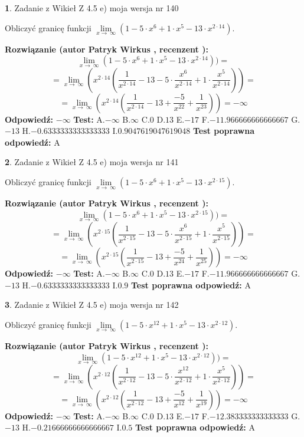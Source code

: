 \documentclass[12pt, a4paper]{article}
\theoremstyle{definition} %
\newtheorem{zad}{}
\newcommand{\zadStart}[1]{\begin{zad}#1\newline}
\newcommand{\zadStop}{\end{zad}}
\newcommand{\rozwStart}[2]{\noindent \textbf{Rozwiązanie (autor #1 , recenzent #2): }\newline}
\newcommand{\rozwStop}{\newline}
\newcommand{\odpStart}{\noindent \textbf{Odpowiedź:}\newline}
\newcommand{\odpStop}{\newline}
\newcommand{\testStart}{\noindent \textbf{Test:}\newline}
\newcommand{\testStop}{\newline}
\newcommand{\kluczStart}{\noindent \textbf{Test poprawna odpowiedź:}\newline}
\newcommand{\kluczStop}{\newline}
\begin{document}
\zadStart{Zadanie z Wikieł Z 4.5 e) moja wersja nr 140}


Obliczyć granicę funkcji  $\lim\limits_{x\to\ \infty}(1 - 5 \cdot x^{6}+1 \cdot x^{5}- 13 \cdot x^{2\cdot14})$.
\zadStop
\rozwStart{Patryk Wirkus}{}
$$\lim\limits_{x\to\ \infty}(1 - 5 \cdot x^{6}+1 \cdot x^{5}- 13 \cdot x^{2\cdot14}))=$$
$$=\lim\limits_{x\to\ \infty}(x^{2\cdot14}(\frac{1}{x^{2\cdot14}}-13 -5 \cdot \frac{x^{6}}{x^{2\cdot14}}+1 \cdot \frac{x^{5}}{x^{2\cdot14}}))=$$
$$=\lim\limits_{x\to\ \infty}(x^{2\cdot14}(\frac{1}{x^{2\cdot14}}-13 + \frac{-5}{x^{22}}+ \frac{1}{x^{23}}))=-\infty$$
\rozwStop
\odpStart
$-\infty$
\odpStop
\testStart
A.$-\infty$ B.$\infty$ C.$0$ D.$13$ E.$-17$
F.$-11.966666666666667$ G.$-13$
H.$-0.6333333333333333$
I.$0.9047619047619048$
\testStop
\kluczStart
A
\kluczStop



\zadStart{Zadanie z Wikieł Z 4.5 e) moja wersja nr 141}


Obliczyć granicę funkcji  $\lim\limits_{x\to\ \infty}(1 - 5 \cdot x^{6}+1 \cdot x^{5}- 13 \cdot x^{2\cdot15})$.
\zadStop
\rozwStart{Patryk Wirkus}{}
$$\lim\limits_{x\to\ \infty}(1 - 5 \cdot x^{6}+1 \cdot x^{5}- 13 \cdot x^{2\cdot15}))=$$
$$=\lim\limits_{x\to\ \infty}(x^{2\cdot15}(\frac{1}{x^{2\cdot15}}-13 -5 \cdot \frac{x^{6}}{x^{2\cdot15}}+1 \cdot \frac{x^{5}}{x^{2\cdot15}}))=$$
$$=\lim\limits_{x\to\ \infty}(x^{2\cdot15}(\frac{1}{x^{2\cdot15}}-13 + \frac{-5}{x^{24}}+ \frac{1}{x^{25}}))=-\infty$$
\rozwStop
\odpStart
$-\infty$
\odpStop
\testStart
A.$-\infty$ B.$\infty$ C.$0$ D.$13$ E.$-17$
F.$-11.966666666666667$ G.$-13$
H.$-0.6333333333333333$
I.$0.9$
\testStop
\kluczStart
A
\kluczStop



\zadStart{Zadanie z Wikieł Z 4.5 e) moja wersja nr 142}


Obliczyć granicę funkcji  $\lim\limits_{x\to\ \infty}(1 - 5 \cdot x^{12}+1 \cdot x^{5}- 13 \cdot x^{2\cdot12})$.
\zadStop
\rozwStart{Patryk Wirkus}{}
$$\lim\limits_{x\to\ \infty}(1 - 5 \cdot x^{12}+1 \cdot x^{5}- 13 \cdot x^{2\cdot12}))=$$
$$=\lim\limits_{x\to\ \infty}(x^{2\cdot12}(\frac{1}{x^{2\cdot12}}-13 -5 \cdot \frac{x^{12}}{x^{2\cdot12}}+1 \cdot \frac{x^{5}}{x^{2\cdot12}}))=$$
$$=\lim\limits_{x\to\ \infty}(x^{2\cdot12}(\frac{1}{x^{2\cdot12}}-13 + \frac{-5}{x^{12}}+ \frac{1}{x^{19}}))=-\infty$$
\rozwStop
\odpStart
$-\infty$
\odpStop
\testStart
A.$-\infty$ B.$\infty$ C.$0$ D.$13$ E.$-17$
F.$-12.383333333333333$ G.$-13$
H.$-0.21666666666666667$
I.$0.5$
\testStop
\kluczStart
A
\kluczStop
\end{document}
